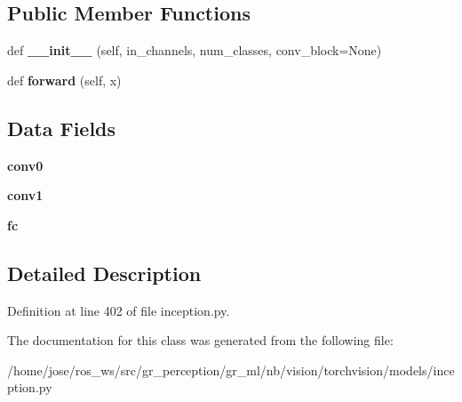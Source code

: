 \subsection*{Public Member Functions}
\begin{DoxyCompactItemize}
\item 
\mbox{\label{classtorchvision_1_1models_1_1inception_1_1InceptionAux_a56c38786df480c905d79f415e7bd305c}} 
def {\bfseries \+\_\+\+\_\+init\+\_\+\+\_\+} (self, in\+\_\+channels, num\+\_\+classes, conv\+\_\+block=None)
\item 
\mbox{\label{classtorchvision_1_1models_1_1inception_1_1InceptionAux_a9c504f7d85915ec08a548b580b8fa5f4}} 
def {\bfseries forward} (self, x)
\end{DoxyCompactItemize}
\subsection*{Data Fields}
\begin{DoxyCompactItemize}
\item 
\mbox{\label{classtorchvision_1_1models_1_1inception_1_1InceptionAux_a96059c68db1953448d8536fdca686f71}} 
{\bfseries conv0}
\item 
\mbox{\label{classtorchvision_1_1models_1_1inception_1_1InceptionAux_a0455d0404238d968ed4e90be3f061776}} 
{\bfseries conv1}
\item 
\mbox{\label{classtorchvision_1_1models_1_1inception_1_1InceptionAux_ad67093f56cd14489b13c8f12d14ece37}} 
{\bfseries fc}
\end{DoxyCompactItemize}


\subsection{Detailed Description}


Definition at line 402 of file inception.\+py.



The documentation for this class was generated from the following file\+:\begin{DoxyCompactItemize}
\item 
/home/jose/ros\+\_\+ws/src/gr\+\_\+perception/gr\+\_\+ml/nb/vision/torchvision/models/inception.\+py\end{DoxyCompactItemize}
